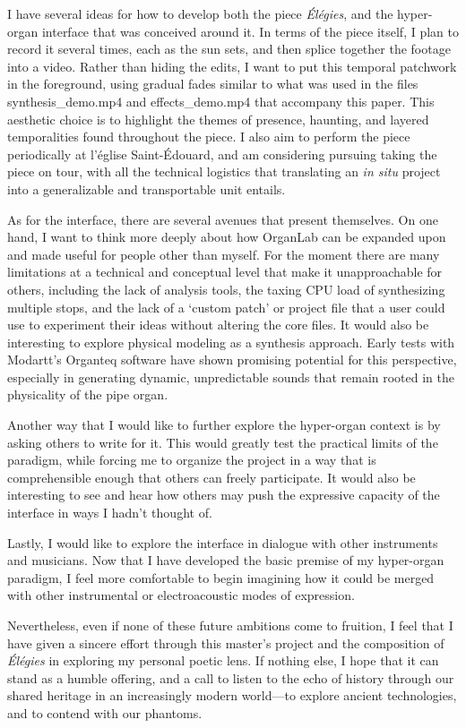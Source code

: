 \documentclass[12pt,twoside,maitrise]{dms_ks}
\theoremstyle{definition}
\begin{document}
{I have several ideas for how to develop both the piece \textit{Élégies}, and the hyper-organ interface that was conceived around it. 
In terms of the piece itself, I plan to record it several times, each as the sun sets, and then splice together the footage into a video.
Rather than hiding the edits, I want to put this temporal patchwork in the foreground, using gradual fades similar to what was used in the files synthesis\_demo.mp4 and effects\_demo.mp4 that accompany this paper.
This aesthetic choice is to highlight the themes of presence, haunting, and layered temporalities found throughout the piece.
I also aim to perform the piece periodically at l'église Saint-Édouard, and am considering pursuing taking the piece on tour, with all the technical logistics that translating an \textit{in situ} project into a generalizable and transportable unit entails.

As for the interface, there are several avenues that present themselves. 
On one hand, I want to think more deeply about how OrganLab can be expanded upon and made useful for people other than myself. 
For the moment there are many limitations at a technical and conceptual level that make it unapproachable for others, including the lack of analysis tools, the taxing CPU load of synthesizing multiple stops, and the lack of a `custom patch' or project file that a user could use to experiment their ideas without altering the core files. 
It would also be interesting to explore physical modeling as a synthesis approach.
Early tests with Modartt's Organteq software have shown promising potential for this perspective, especially in generating dynamic, unpredictable sounds that remain rooted in the physicality of the pipe organ.

Another way that I would like to further explore the hyper-organ context is by asking others to write for it. 
This would greatly test the practical limits of the paradigm, while forcing me to organize the project in a way that is comprehensible enough that others can freely participate. 
It would also be interesting to see and hear how others may push the expressive capacity of the interface in ways I hadn't thought of.

Lastly, I would like to explore the interface in dialogue with other instruments and musicians. 
Now that I have developed the basic premise of my hyper-organ paradigm, I feel more comfortable to begin imagining how it could be merged with other instrumental or electroacoustic modes of expression.

Nevertheless, even if none of these future ambitions come to fruition, I feel that I have given a sincere effort through this master's project and the composition of \textit{Élégies} in exploring my personal poetic lens. 
If nothing else, I hope that it can stand as a humble offering, and a call to listen to the echo of history through our shared heritage in an increasingly modern world---to explore ancient technologies, and to contend with our phantoms.

}
\end{document}
